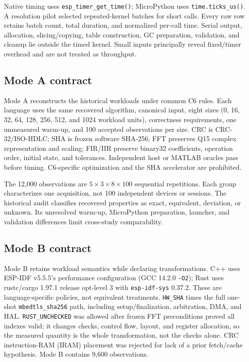 \documentclass[10pt]{article}
\begin{document}
Native timing uses \texttt{esp\_timer\_get\_time()}; MicroPython uses \texttt{time.ticks\_us()}. A resolution pilot selected repeated-kernel batches for short calls. Every raw row retains batch count, total duration, and normalized per-call time. Serial output, allocation, slicing/copying, table construction, GC preparation, validation, and cleanup lie outside the timed kernel. Small inputs principally reveal fixed/timer overhead and are not treated as throughput.

\subsection{Mode A contract}
Mode A reconstructs the historical workloads under common C6 rules. Each language uses the same recovered algorithm, canonical input, eight sizes (0, 16, 32, 64, 128, 256, 512, and 1024 workload units), correctness requirements, one unmeasured warm-up, and 100 accepted observations per size. CRC is CRC-32/ISO-HDLC; SHA is frozen software SHA-256; FFT preserves Q15 complex representation and scaling; FIR/IIR preserve binary32 coefficients, operation order, initial state, and tolerances. Independent host or MATLAB oracles pass before timing. C6-specific optimization and the SHA accelerator are prohibited.

The 12,000 observations are $5\times3\times8\times100$ sequential repetitions. Each group characterizes one acquisition, not 100 independent devices or sessions. The historical audit classifies recovered properties as exact, equivalent, deviation, or unknown. Its unresolved warm-up, MicroPython preparation, launcher, and validation differences limit cross-study comparability.

\subsection{Mode B contract}
Mode B retains workload semantics while declaring transformations. C++ uses ESP-IDF v5.5.5's performance configuration (GCC 14.2.0 \texttt{-O2}); Rust uses rustc/cargo 1.97.1 release opt-level 3 with \texttt{esp-idf-sys} 0.37.2. These are language-specific policies, not equivalent treatments. \texttt{HW\_SHA} times the full one-shot \texttt{mbedtls\_sha256} path, including setup/finalization, arbitration, DMA, and HAL. \texttt{RUST\_UNCHECKED} was allowed after frozen FFT preconditions proved all indexes valid; it changes checks, control flow, layout, and register allocation, so the measured quantity is the whole transformation, not the checks alone. CRC instruction-RAM (IRAM) placement was rejected for lack of a prior fetch/cache hypothesis. Mode B contains 9,600 observations.
\end{document}
